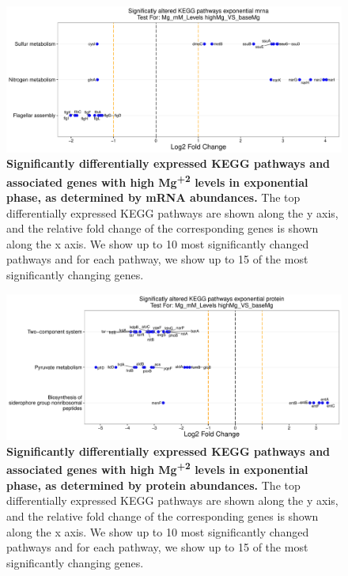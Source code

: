 \documentclass[a4paper]{article}
\begin{document}
\clearpage
\begin{figure}
	\includegraphics[width=1.0\textwidth]{../../d_figures/kegg_10.pdf}
	\caption[Significantly altered KEGG pathways for mRNA samples in exponential phase tested for high Mg\textsuperscript{+2} against base Mg\textsuperscript{+2}]
	{\textbf{Significantly differentially expressed KEGG pathways and associated genes with high Mg\textsuperscript{+2} levels in exponential phase, as determined by mRNA abundances.} The top differentially expressed KEGG pathways are shown along the y axis, and the relative fold change of the corresponding genes is shown along the x axis. We show up to 10 most significantly changed pathways and for each pathway, we show up to 15 of the most significantly changing genes.}
\end{figure}

\clearpage
\begin{figure}
	\includegraphics[width=1.0\textwidth]{../../d_figures/kegg_11.pdf}
	\caption[Significantly altered KEGG pathways for protein samples in exponential phase tested for high Mg\textsuperscript{+2} against base Mg\textsuperscript{+2}]
	{\textbf{Significantly differentially expressed KEGG pathways and associated genes with high Mg\textsuperscript{+2} levels in exponential phase, as determined by protein abundances.} The top differentially expressed KEGG pathways are shown along the y axis, and the relative fold change of the corresponding genes is shown along the x axis. We show up to 10 most significantly changed pathways and for each pathway, we show up to 15 of the most significantly changing genes.}
\end{figure}
\end{document}
